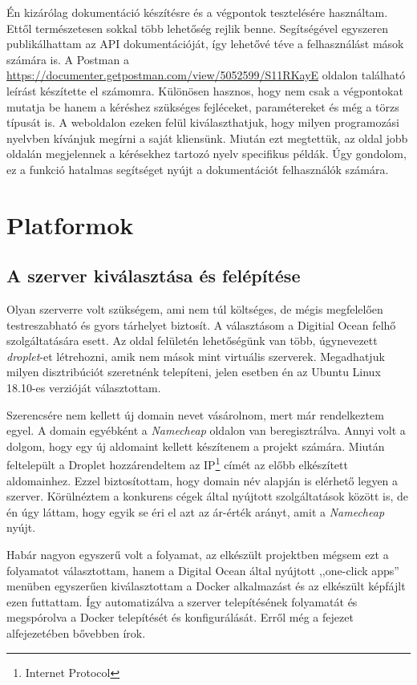 \documentclass{thesis-ekf}
\theoremstyle{definition}
\theoremstyle{remark}
\begin{document}
Én kizárólag dokumentáció készítésre és a végpontok tesztelésére használtam. Ettől természetesen sokkal több lehetőség rejlik benne.
Segítségével egyszeren publikálhattam az API dokumentációját, így lehetővé téve a felhasználást mások számára is.
A Postman a \url{https://documenter.getpostman.com/view/5052599/S11RKayE} oldalon található leírást készítette el számomra.
Különösen hasznos, hogy nem csak a végpontokat mutatja be hanem a kéréshez szükséges fejléceket, paramétereket és még a törzs típusát is.
A weboldalon ezeken felül kiválaszthatjuk, hogy milyen programozási nyelvben kívánjuk megírni a saját kliensünk.
Miután ezt megtettük, az oldal jobb oldalán megjelennek a kérésekhez tartozó nyelv specifikus példák.
Úgy gondolom, ez a funkció hatalmas segítséget nyújt a dokumentációt felhasználók számára.

\chapter{Platformok}\label{platformok}

\section{A szerver kiválasztása és felépítése}

Olyan szerverre volt szükségem, ami nem túl költséges, de mégis megfelelően testreszabható és gyors tárhelyet biztosít.
A választásom a Digitial Ocean felhő szolgáltatására esett. Az oldal felületén lehetőségünk van több, úgynevezett \emph{droplet}-et létrehozni, amik nem mások mint virtuális szerverek. 
Megadhatjuk milyen disztribúciót szeretnénk telepíteni, jelen esetben én az Ubuntu Linux 18.10-es verzióját választottam.

Szerencsére nem kellett új domain nevet vásárolnom, mert már rendelkeztem egyel.
A domain egyébként a \emph{Namecheap} oldalon van beregisztrálva.
Annyi volt a dolgom, hogy egy új aldomaint kellett készítenem a projekt számára.
Miután feltelepült a Droplet hozzárendeltem az IP\footnote{Internet Protocol} címét az előbb elkészített aldomainhez.
Ezzel biztosítottam, hogy domain név alapján is elérhető legyen a szerver.
Körülnéztem a konkurens cégek által nyújtott szolgáltatások között is, de én úgy láttam, hogy egyik se éri el azt az ár-érték arányt, amit a \emph{Namecheap} nyújt. 

Habár nagyon egyszerű volt a folyamat, az elkészült projektben mégsem ezt a folyamatot választottam, hanem a Digital Ocean által nyújtott ,,one-click apps'' menüben egyszerűen kiválasztottam a Docker alkalmazást és az elkészült képfájlt ezen futtattam. 
Így automatizálva a szerver telepítésének folyamatát és megspórolva a Docker telepítését és konfigurálását.
Erről még a  fejezet  alfejezetében bővebben írok.
\end{document}
